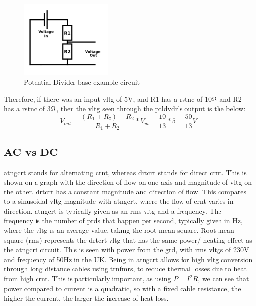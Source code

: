 \documentclass[a4paper,11pt]{report}
\begin{document}
\begin{figure}[H]
\centering
\includegraphics[width=0.4\textwidth]{PotentialDivider}
\caption{Potential Divider base example circuit}
\end{figure}

Therefore, if there was an input \gls{vltg} of 5V, and R1 has a \gls{rstnc} of 10$\ohm$ and R2 has a \gls{rstnc} of 3$\ohm$, then the \gls{vltg} seen through the \gls{ptldvdr}'s output is the below:
\[V_{out}=\frac{(R_1+R_2)-R_2}{R_1+R_2}*V_{in} = \frac{10}{13}*5 = \frac{50}{13}V\]

\vspace*{1\baselineskip}

\subsection{AC vs DC}

\gls{atngcrt} stands for alternating \gls{crnt}, whereas \gls{drtcrt} stands for direct \gls{crnt}. This is shown on a graph with the direction of flow on one axis and magnitude of \gls{vltg} on the other. \gls{drtcrt} has a constant magnitude and direction of flow. This compares to a sinusoidal \gls{vltg} magnitude with \gls{atngcrt}, where the flow of \gls{crnt} varies in direction. \gls{atngcrt} is typically given as an \gls{rms} \gls{vltg} and a frequency. The frequency is the number of \gls{prd}s that happen per second, typically given in Hz, where the \gls{vltg} is an average value, taking the root mean square. Root mean square (\gls{rms}) represents the \gls{drtcrt} \gls{vltg} that has the same power/ heating effect as the \gls{atngcrt} circuit. This is seen with power from the \gls{grd}, with \gls{rms} \gls{vltg}s of 230V and frequency of 50Hz in the UK.
Being in \gls{atngcrt} allows for high \gls{vltg} conversion through long distance cables using \gls{trnfmr}s, to reduce thermal losses due to heat from high \gls{crnt}.
This is particularly important, as using $P=I^2R$, we can see that power compared to current is a quadratic, so with a fixed cable resistance, the higher the current, the larger the increase of heat loss.
\end{document}
